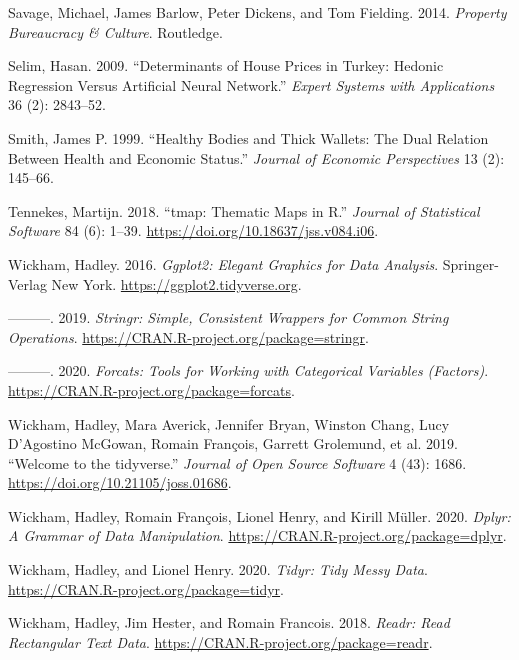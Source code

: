 \documentclass[conference,final,]{IEEEtran}
\newlength{\cslhangindent}
\newenvironment{cslreferences}%
  {\setlength{\parindent}{0pt}%
  \everypar{\setlength{\hangindent}{\cslhangindent}}\ignorespaces}%
  {\par}
\begin{document}
\begin{cslreferences}
\leavevmode\hypertarget{ref-savage2014property}{}%
Savage, Michael, James Barlow, Peter Dickens, and Tom Fielding. 2014. \emph{Property Bureaucracy \& Culture}. Routledge.

\leavevmode\hypertarget{ref-selim2009determinants}{}%
Selim, Hasan. 2009. ``Determinants of House Prices in Turkey: Hedonic Regression Versus Artificial Neural Network.'' \emph{Expert Systems with Applications} 36 (2): 2843--52.

\leavevmode\hypertarget{ref-smith1999healthy}{}%
Smith, James P. 1999. ``Healthy Bodies and Thick Wallets: The Dual Relation Between Health and Economic Status.'' \emph{Journal of Economic Perspectives} 13 (2): 145--66.

\leavevmode\hypertarget{ref-R-tmap}{}%
Tennekes, Martijn. 2018. ``tmap: Thematic Maps in R.'' \emph{Journal of Statistical Software} 84 (6): 1--39. \url{https://doi.org/10.18637/jss.v084.i06}.

\leavevmode\hypertarget{ref-R-ggplot2}{}%
Wickham, Hadley. 2016. \emph{Ggplot2: Elegant Graphics for Data Analysis}. Springer-Verlag New York. \url{https://ggplot2.tidyverse.org}.

\leavevmode\hypertarget{ref-R-stringr}{}%
---------. 2019. \emph{Stringr: Simple, Consistent Wrappers for Common String Operations}. \url{https://CRAN.R-project.org/package=stringr}.

\leavevmode\hypertarget{ref-R-forcats}{}%
---------. 2020. \emph{Forcats: Tools for Working with Categorical Variables (Factors)}. \url{https://CRAN.R-project.org/package=forcats}.

\leavevmode\hypertarget{ref-R-tidyverse}{}%
Wickham, Hadley, Mara Averick, Jennifer Bryan, Winston Chang, Lucy D'Agostino McGowan, Romain François, Garrett Grolemund, et al. 2019. ``Welcome to the tidyverse.'' \emph{Journal of Open Source Software} 4 (43): 1686. \url{https://doi.org/10.21105/joss.01686}.

\leavevmode\hypertarget{ref-R-dplyr}{}%
Wickham, Hadley, Romain François, Lionel Henry, and Kirill Müller. 2020. \emph{Dplyr: A Grammar of Data Manipulation}. \url{https://CRAN.R-project.org/package=dplyr}.

\leavevmode\hypertarget{ref-R-tidyr}{}%
Wickham, Hadley, and Lionel Henry. 2020. \emph{Tidyr: Tidy Messy Data}. \url{https://CRAN.R-project.org/package=tidyr}.

\leavevmode\hypertarget{ref-R-readr}{}%
Wickham, Hadley, Jim Hester, and Romain Francois. 2018. \emph{Readr: Read Rectangular Text Data}. \url{https://CRAN.R-project.org/package=readr}.


\end{cslreferences}
\end{document}
